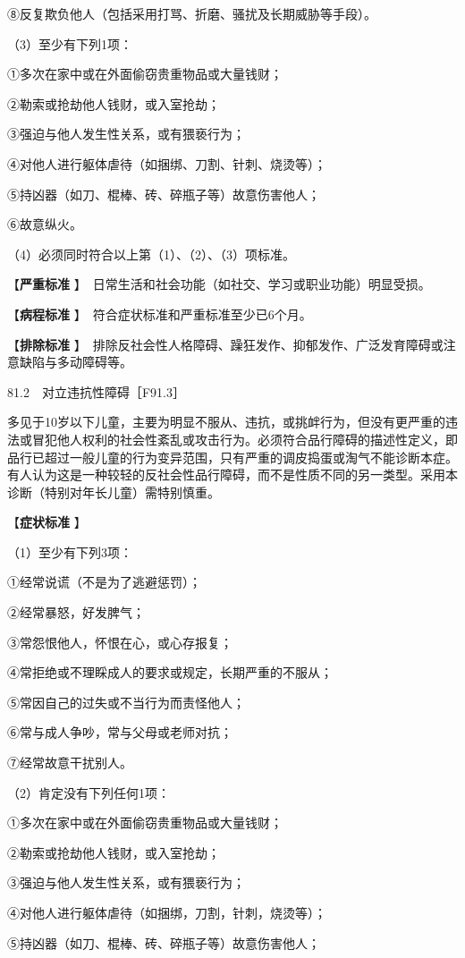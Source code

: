 ⑧反复欺负他人（包括采用打骂、折磨、骚扰及长期威胁等手段）。

（3）至少有下列1项：

①多次在家中或在外面偷窃贵重物品或大量钱财；

②勒索或抢劫他人钱财，或入室抢劫；

③强迫与他人发生性关系，或有猥亵行为；

④对他人进行躯体虐待（如捆绑、刀割、针刺、烧烫等）；

⑤持凶器（如刀、棍棒、砖、碎瓶子等）故意伤害他人；

⑥故意纵火。

（4）必须同时符合以上第（1）、（2）、（3）项标准。

【\textbf{严重标准}
】　日常生活和社会功能（如社交、学习或职业功能）明显受损。

【\textbf{病程标准} 】　符合症状标准和严重标准至少已6个月。

【\textbf{排除标准}
】　排除反社会性人格障碍、躁狂发作、抑郁发作、广泛发育障碍或注意缺陷与多动障碍等。

81.2　对立违抗性障碍［F91.3］

多见于10岁以下儿童，主要为明显不服从、违抗，或挑衅行为，但没有更严重的违法或冒犯他人权利的社会性紊乱或攻击行为。必须符合品行障碍的描述性定义，即品行已超过一般儿童的行为变异范围，只有严重的调皮捣蛋或淘气不能诊断本症。有人认为这是一种较轻的反社会性品行障碍，而不是性质不同的另一类型。采用本诊断（特别对年长儿童）需特别慎重。

【\textbf{症状标准} 】

（1）至少有下列3项：

①经常说谎（不是为了逃避惩罚）；

②经常暴怒，好发脾气；

③常怨恨他人，怀恨在心，或心存报复；

④常拒绝或不理睬成人的要求或规定，长期严重的不服从；

⑤常因自己的过失或不当行为而责怪他人；

⑥常与成人争吵，常与父母或老师对抗；

⑦经常故意干扰别人。

（2）肯定没有下列任何1项：

①多次在家中或在外面偷窃贵重物品或大量钱财；

②勒索或抢劫他人钱财，或入室抢劫；

③强迫与他人发生性关系，或有猥亵行为；

④对他人进行躯体虐待（如捆绑，刀割，针刺，烧烫等）；

⑤持凶器（如刀、棍棒、砖、碎瓶子等）故意伤害他人；

